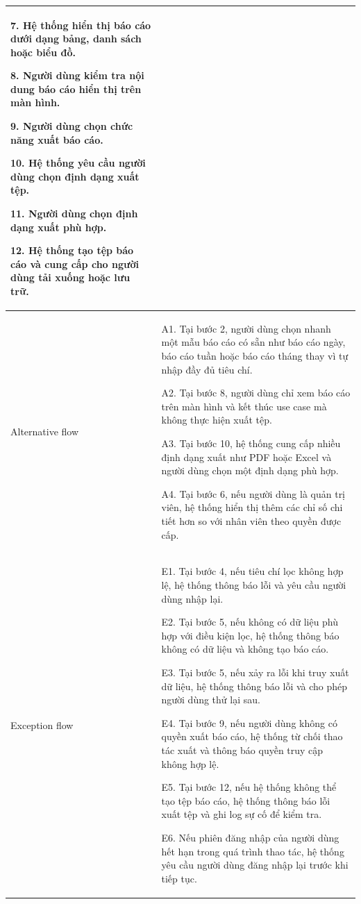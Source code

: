\begin{center}
\begin{longtable}{|m{2.5cm}|m{13cm}|}
7. Hệ thống hiển thị báo cáo dưới dạng bảng, danh sách hoặc biểu đồ.

8. Người dùng kiểm tra nội dung báo cáo hiển thị trên màn hình.

9. Người dùng chọn chức năng xuất báo cáo.

10. Hệ thống yêu cầu người dùng chọn định dạng xuất tệp.

11. Người dùng chọn định dạng xuất phù hợp.

12. Hệ thống tạo tệp báo cáo và cung cấp cho người dùng tải xuống hoặc lưu trữ.\\
\hline
Alternative flow & 
A1. Tại bước 2, người dùng chọn nhanh một mẫu báo cáo có sẵn như báo cáo ngày, báo cáo tuần hoặc báo cáo tháng thay vì tự nhập đầy đủ tiêu chí.

A2. Tại bước 8, người dùng chỉ xem báo cáo trên màn hình và kết thúc use case mà không thực hiện xuất tệp.

A3. Tại bước 10, hệ thống cung cấp nhiều định dạng xuất như PDF hoặc Excel và người dùng chọn một định dạng phù hợp.

A4. Tại bước 6, nếu người dùng là quản trị viên, hệ thống hiển thị thêm các chỉ số chi tiết hơn so với nhân viên theo quyền được cấp.\\ 
\hline
Exception flow & 
E1. Tại bước 4, nếu tiêu chí lọc không hợp lệ, hệ thống thông báo lỗi và yêu cầu người dùng nhập lại.

E2. Tại bước 5, nếu không có dữ liệu phù hợp với điều kiện lọc, hệ thống thông báo không có dữ liệu và không tạo báo cáo.

E3. Tại bước 5, nếu xảy ra lỗi khi truy xuất dữ liệu, hệ thống thông báo lỗi và cho phép người dùng thử lại sau.

E4. Tại bước 9, nếu người dùng không có quyền xuất báo cáo, hệ thống từ chối thao tác xuất và thông báo quyền truy cập không hợp lệ.

E5. Tại bước 12, nếu hệ thống không thể tạo tệp báo cáo, hệ thống thông báo lỗi xuất tệp và ghi log sự cố để kiểm tra.

E6. Nếu phiên đăng nhập của người dùng hết hạn trong quá trình thao tác, hệ thống yêu cầu người dùng đăng nhập lại trước khi tiếp tục.\\
\hline
\end{longtable}
\end{center} 
\vspace{-1cm}